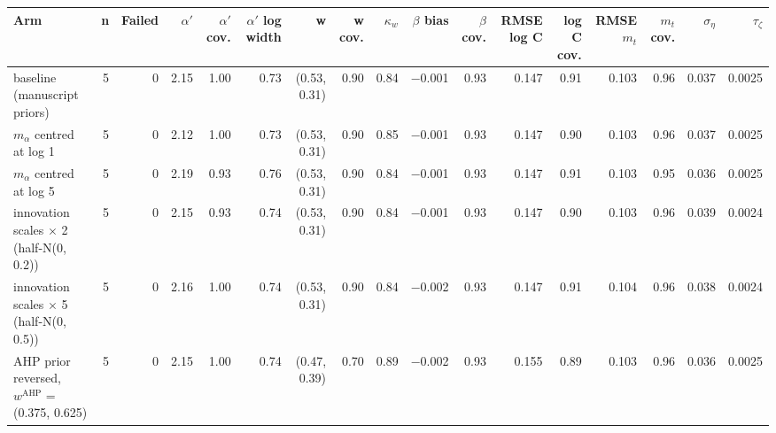 \documentclass[10pt,a4paper]{article}
\begin{document}
\begin{landscape}
\noindent\begin{minipage}{\linewidth}
\label{tab:S6}
\centering\scriptsize
\begin{tabular}{lrrrrrrrrrrrrrrrr}
\toprule
Arm & n & Failed & $\alpha'$ & $\alpha'$ cov. & $\alpha'$ log width & w & w cov. & $\kappa_w$ & $\beta$ bias & $\beta$ cov. & RMSE log C & log C cov. & RMSE $m_t$ & $m_t$ cov. & $\sigma_\eta$ & $\tau_\zeta$ \\ \midrule
baseline (manuscript priors) & 5 & 0 & 2.15 & 1.00 & 0.73 & (0.53, 0.31) & 0.90 & 0.84 & −0.001 & 0.93 & 0.147 & 0.91 & 0.103 & 0.96 & 0.037 & 0.0025 \\
$m_\alpha$ centred at log 1 & 5 & 0 & 2.12 & 1.00 & 0.73 & (0.53, 0.31) & 0.90 & 0.85 & −0.001 & 0.93 & 0.147 & 0.90 & 0.103 & 0.96 & 0.037 & 0.0025 \\
$m_\alpha$ centred at log 5 & 5 & 0 & 2.19 & 0.93 & 0.76 & (0.53, 0.31) & 0.90 & 0.84 & −0.001 & 0.93 & 0.147 & 0.91 & 0.103 & 0.95 & 0.036 & 0.0025 \\
innovation scales $\times$ 2 (half-N(0, 0.2)) & 5 & 0 & 2.15 & 0.93 & 0.74 & (0.53, 0.31) & 0.90 & 0.84 & −0.001 & 0.93 & 0.147 & 0.90 & 0.103 & 0.96 & 0.039 & 0.0024 \\
innovation scales $\times$ 5 (half-N(0, 0.5)) & 5 & 0 & 2.16 & 1.00 & 0.74 & (0.53, 0.31) & 0.90 & 0.84 & −0.002 & 0.93 & 0.147 & 0.91 & 0.104 & 0.96 & 0.038 & 0.0024 \\
AHP prior reversed, $w^{\mathrm{AHP}}$ = (0.375, 0.625) & 5 & 0 & 2.15 & 1.00 & 0.74 & (0.47, 0.39) & 0.70 & 0.89 & −0.002 & 0.93 & 0.155 & 0.89 & 0.103 & 0.96 & 0.036 & 0.0025 \\
\bottomrule
\end{tabular}
\end{minipage}
\vspace{22pt}
\end{landscape}
\end{document}
